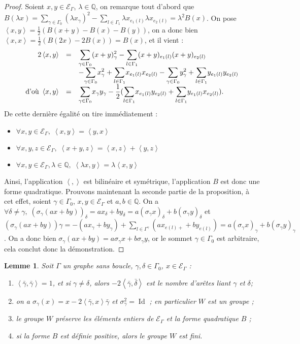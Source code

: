 \documentclass[a4paper,10pt]{article}
\newtheorem{lm}[]{Lemme}[section]
\DeclareMathOperator{\Id}{Id}
\newcommand{\ps}[2]{\left\langle#1,#2\right\rangle}
\newcommand{\EG}{\mathscr{E}_\Gamma}
\newcommand{\dps}{\displaystyle}
\begin{document}
		\begin{proof}
			Soient $x,y\in\EG$, $\lambda\in\mathbb{Q}$, on remarque tout d'abord que $B(\lambda x)=\sum_{\gamma\in\Gamma_0}(\lambda x_\gamma)^2-\sum_{l\in\Gamma_1}\lambda x_{e_1(l)}\lambda x_{e_2(l)}=\lambda^2B(x)$. On pose $\ps{x}{y}=\frac{1}{2}(B(x+y)-B(x)-B(y))$, on a donc bien $\ps{x}{x}=\frac{1}{2}(B(2x)-2B(x))=B(x)$, et il vient :
			\[
		\begin{array}{>{\dps}r>{\dps}l>{\dps}l}
			2\ps{x}{y}&=& \underset{\gamma\in\Gamma_0}{\sum}(x+y)_\gamma^2 -\underset{l\in\Gamma_1}{\sum}(x+y)_{e_1(l)}(x+y)_{e_2(l)}\\
		&&-\underset{\gamma\in\Gamma_0}{\sum}x_\gamma^2 +\underset{l\in\Gamma_1}{\sum}x_{e_1(l)}x_{e_2(l)}-\underset{\gamma\in\Gamma_0}{\sum}y_\gamma^2 +\underset{l\in\Gamma_1}{\sum}y_{e_1(l)}y_{e_2(l)}\\
		\text{d'où }\ps{x}{y}&=&  \underset{\gamma\in\Gamma_0}{\sum}x_\gamma y_\gamma -\frac{1}{2}(\underset{l\in\Gamma_1}{\sum}x_{e_1(l)} y_{e_2(l)}+\underset{l\in\Gamma_1}{\sum}y_{e_1(l)} x_{e_2(l)}).
		\end{array}
			\]
			De cette dernière égalité on tire immédiatement :
			\begin{itemize}
					\item $\forall x,y\in\EG,\; \ps{x}{y}=\ps{y}{x}$
					\item $\forall x,y,z\in\EG,\; \ps{x+y}{z}=\ps{x}{z}+\ps{y}{z}$
					\item $\forall x,y\in\EG,\lambda\in\mathbb Q,\;\ps{\lambda x}{y}=\lambda\ps{x}{y}$
			\end{itemize}
			Ainsi, l'application $\ps{}{}$ est bilinéaire et symétrique, l'application $B$ est donc une forme quadratique. Prouvons maintenant la seconde partie de la proposition, à cet effet, soient $\gamma\in\Gamma_0$, $x,y\in\EG$ et $a,b\in\mathbb Q$. On a $\forall\delta\neq\gamma,\;(\sigma_\gamma(ax+by))_\delta=ax_\delta+by_\delta=a(\sigma_\gamma x)_\delta+b(\sigma_\gamma y)_\delta$ et $(\sigma_\gamma (ax+by))\gamma=-(ax_\gamma+by_\gamma)+\sum_{l\in\Gamma^\gamma}(ax_{e(l)+}+by_{e(l)})=a(\sigma_\gamma x)_\gamma+b(\sigma_\gamma y)_\gamma$. On a donc bien $\sigma_\gamma(ax+by)=a\sigma_\gamma x+b\sigma_\gamma y$, or le sommet $\gamma\in\Gamma_{0}$ est arbitraire, cela conclut donc la démonstration.
		\end{proof}
		\begin{lm}
			\label{elem}
		Soit $\Gamma$ un graphe sans boucle, $\gamma,\delta\in\Gamma_0$, $x\in\EG$ :
		\begin{enumerate}
			\item $\ps{\bar\gamma}{\bar\gamma}=1$, et si $\gamma\neq\delta$, alors $-2\ps{\bar\gamma}{\bar\delta}$ est le nombre d'arêtes liant $\gamma$ et $\delta$;
			\item on a $\sigma_\gamma(x)=x-2\ps{\bar\gamma}{x}\bar\gamma$ et $\sigma_\gamma^2=\Id$ ; en particulier $W$ est un groupe ;
			\item le groupe $W$ préserve les éléments entiers de $\EG$ et la forme quadratique $B$ ;
			\item si la forme $B$ est définie positive, alors le groupe $W$ est fini.
		\end{enumerate}
\end{lm}
\end{document}
